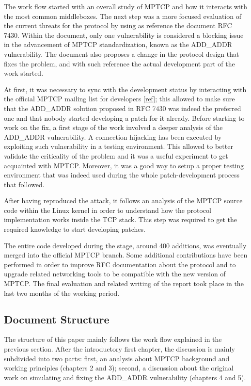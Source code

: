 The work flow started with an overall study of MPTCP and how it interacts with the most common middleboxes. The next step was a more focused evaluation of the current threats for the protocol by using as reference the document RFC 7430. Within the document, only one vulnerability is considered a blocking issue in the advancement of MPTCP standardization, known as the ADD\_ADDR vulnerability. The document also proposes a change in the protocol design that fixes the problem, and with such reference the actual development part of the work started.

\vspace{5mm}
At first, it was necessary to sync with the development status by interacting with the official MPTCP mailing list for developers [\href{https://listes-2.sipr.ucl.ac.be/sympa}{ref}]; this allowed to make sure that the ADD\_ADDR solution proposed in RFC 7430 was indeed the preferred one and that nobody started developing a patch for it already.
Before starting to work on the fix, a first stage of the work involved a deeper analysis of the ADD\_ADDR vulnerability. A connection hijacking has been executed by exploiting such vulnerability in a testing environment. This allowed to better validate the criticality of the problem and it was a useful experiment to get acquainted with MPTCP. Moreover, it was a good way to setup a proper testing environment that was indeed used during the whole patch-development process that followed.


After having reproduced the attack, it follows an analysis of the MPTCP source code within the Linux kernel in order to understand how the protocol implementation works inside the TCP stack. This step was required to get the required knowledge to start developing patches.


The entire code developed during the stage, around 400 additions, was eventually merged into the official MPTCP branch. Some additional contributions have been performed in order to improve RFC documentation about the protocol and to upgrade related networking tools to be compatible with the new version of MPTCP.
The final evaluation and related writing of the report took place in the last two months of the working period.

\subsection{Document Structure}
The structure of this paper mainly follows the work flow explained in the previous section. After the introductory first chapter, the discussion is mainly subdivided into two parts: first, an analysis about MPTCP background and working principles (chapters 2 and 3); second, a discussion about the original work on simulating and fixing the ADD\_ADDR vulnerability (chapters 4 and 5).


